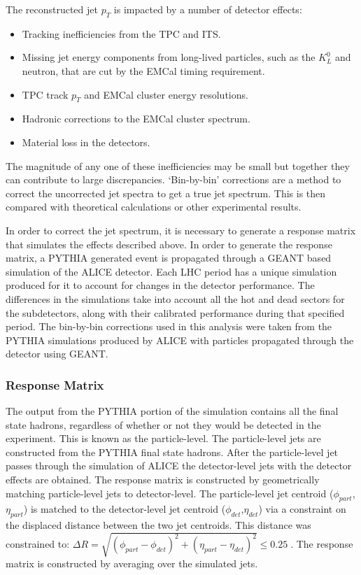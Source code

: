 The reconstructed jet $p_{T}$ is impacted by a number of detector effects:

\begin{itemize}
\item Tracking inefficiencies from the TPC and ITS.
\item Missing jet energy components from long-lived particles, such as the $K^{0}_{L}$ and neutron, that are cut by the EMCal timing requirement.
\item TPC track $p_{T}$ and EMCal cluster energy resolutions.
\item Hadronic corrections to the EMCal cluster spectrum.
\item Material loss in the detectors.
\end{itemize}

\noindent
The magnitude of any one of these inefficiencies may be small but together they can contribute to large discrepancies.  `Bin-by-bin' corrections are a method to correct the uncorrected jet spectra to get a true jet spectrum.  This is then compared with theoretical calculations or other experimental results.

In order to correct the jet spectrum, it is necessary to generate a response matrix that simulates the effects described above.  In order to generate the response matrix, a PYTHIA generated event is propagated through a GEANT based simulation of the ALICE detector.  Each LHC period has a unique simulation produced for it to account for changes in the detector performance.  The differences in the simulations take into account all the hot and dead sectors for the subdetectors, along with their calibrated performance during that specified period.  The bin-by-bin corrections used in this analysis were taken from the PYTHIA simulations produced by ALICE with particles propagated through the detector using GEANT.

\subsubsection{Response Matrix}
The output from the PYTHIA portion of the simulation contains all the final state hadrons, regardless of whether or not they would be detected in the experiment.  This is known as the particle-level.  The particle-level jets are constructed from the PYTHIA final state hadrons.  After the particle-level jet passes through the simulation of ALICE the detector-level jets with the detector effects are obtained.
The response matrix is constructed by geometrically matching particle-level jets to detector-level.  The particle-level jet centroid ($\phi_{part}$,$\eta_{part}$) is matched to the detector-level jet centroid ($\phi_{det}$,$\eta_{det}$) via a constraint on the displaced distance between the two jet centroids.  This distance was constrained to: $\Delta  R = \sqrt{(\phi_{part} - \phi_{det})^{2} + (\eta_{part} - \eta_{det})^{2}} \leq 0.25 \; $.  The response matrix is constructed by averaging over the simulated jets.

